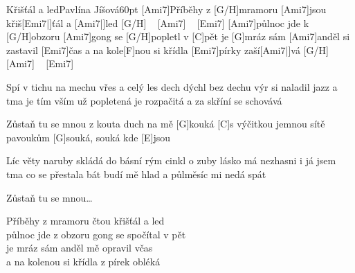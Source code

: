 \begin{song}{Křišťál a led}{Pavlína Jíšová}{60pt}
%
[Ami7]Příběhy z [G/H]mramoru [Ami7]jsou křiš[Emi7|]{ťál a} [Ami7|]{led} [G/H] ~ [Ami7] ~ [Emi7]{}
[Ami7]půlnoc jde k [G/H]obzoru [Ami7]gong se [G/H]popletl v [C]pět
je [G]mráz sám [Ami7]anděl si zastavil [Emi7]{čas}
a na kole[F]nou si křídla [Emi7]pírky zaší[Ami7|]{vá} [G/H] ~ [Ami7] ~ [Emi7]{}

%
Spí v tichu na mechu vřes a celý les
dech dýchl bez dechu výr si naladil jazz
a tma je tím vším už popletená
je rozpačitá a za skříní se schovává

\chorus%
[C]Zůstaň tu se mnou z kouta duch na mě [G]kouká
[C]s výčitkou jemnou sítě pavoukům [G]souká, souká
kde [E]jsou

%
Líc věty naruby skládá do básní
rým cinkl o zuby lásko má nezhasni
i já jsem tma co se přestala bát
budí mě hlad a půlměsíc mi nedá spát

\chorus%
Zůstaň tu se mnou\dots

%
Příběhy z mramoru čtou křišťál a led\\
půlnoc jde z obzoru gong se spočítal v pět\\
je mráz sám anděl mě opravil včas\\
a na kolenou si křídla z pírek obléká\\
\end{song}
